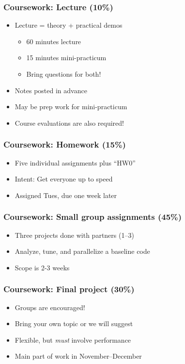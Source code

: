 \documentclass{beamer}
\begin{document}
\begin{frame}
  \frametitle{Coursework: Lecture (10\%)}

  \begin{itemize}
  \item Lecture = theory + practical demos
    \begin{itemize}
    \item 60 minutes lecture
    \item 15 minutes mini-practicum
    \item Bring questions for both!
    \end{itemize}
  \item Notes posted in advance
  \item May be prep work for mini-practicum
  \item Course evaluations are also required!
  \end{itemize}
\end{frame}


\begin{frame}
  \frametitle{Coursework: Homework (15\%)}

  \begin{itemize}
  \item Five individual assignments plus ``HW0''
  \item Intent: Get everyone up to speed
  \item Assigned Tues, due one week later
  \end{itemize}
\end{frame}


\begin{frame}
  \frametitle{Coursework: Small group assignments (45\%)}

  \begin{itemize}
  \item Three projects done with partners (1--3)
  \item Analyze, tune, and parallelize a baseline code
  \item Scope is 2-3 weeks
  \end{itemize}
\end{frame}


\begin{frame}
  \frametitle{Coursework: Final project (30\%)}

  \begin{itemize}
  \item Groups are encouraged!
  \item Bring your own topic or we will suggest
  \item Flexible, but {\em must} involve performance
  \item Main part of work in November--December
  \end{itemize}
\end{frame}
\end{document}
